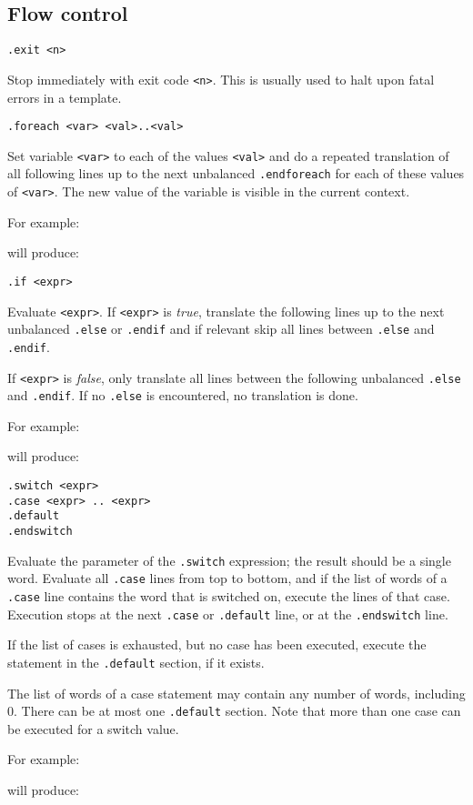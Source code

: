 \subsection{Flow control}
\begin{verbatim}
.exit <n>
\end{verbatim}
\begin{desc}
Stop {\Tm} immediately with exit code {\tt <n>}.
This is usually used to halt upon fatal errors in a template.
\end{desc}
\begin{verbatim}
.foreach <var> <val>..<val>
\end{verbatim}
\begin{desc}
Set variable {\tt <var>} to each of the values {\tt <val>} and do a
repeated translation of all following lines up to the next unbalanced
{\tt .endforeach}
for each of these values of {\tt <var>}.
The new value of the variable is visible in the current context.
\par
For example:

will produce:

\end{desc}
\begin{verbatim}
.if <expr>
\end{verbatim}
\begin{desc}
Evaluate {\tt <expr>}.
If {\tt <expr>} is {\it true},
translate the following lines up to the next unbalanced
{\tt .else} or {\tt .endif}
and if relevant skip all lines between {\tt .else} and {\tt .endif}.

If {\tt <expr>} is {\it false},
only translate all lines between the following unbalanced
{\tt .else} and {\tt .endif}.
If no {\tt .else} is encountered, no translation is done.
\par
For example:

will produce:

\end{desc}
\begin{verbatim}
.switch <expr>
.case <expr> .. <expr>
.default
.endswitch
\end{verbatim}
\begin{desc}
Evaluate the parameter of the \verb'.switch' expression; the result
should be a single word. Evaluate all \verb'.case' lines from top
to bottom, and if the list of words of a \verb'.case' line contains
the word that is switched on, execute the lines of that case.
Execution stops at the next \verb'.case' or \verb'.default' line,
or at the \verb'.endswitch' line.

If the list of cases is exhausted, but no case has been executed,
execute the statement in the \verb'.default' section, if it exists.

The list of words of a case statement may contain any number of words,
including 0.  There can be at most one \verb'.default' section. Note
that more than one case can be executed for a switch value.
\par
For example:

will produce:

\end{desc}
